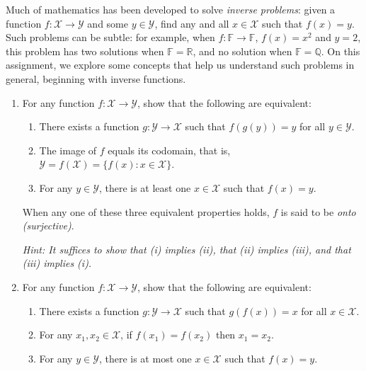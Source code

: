 \documentclass[12 pt,letterpaper]{article}
\newcommand{\bbF}{\mathbb{F}}
\newcommand{\bbQ}{\mathbb{Q}}
\newcommand{\bbR}{\mathbb{R}}
\newcommand{\calX}{\mathcal{X}}
\newcommand{\calY}{\mathcal{Y}}
\newcommand{\set}[1]{\{{#1}\}}
\newcommand{\romanii}{\renewcommand{\labelenumii}{(\roman{enumii})}}
\begin{document}
\noindent
Much of mathematics has been developed to solve \textit{inverse problems}:
given a function $f:\calX\rightarrow\calY$ and some $y\in\calY$,
find any and all $x\in\calX$ such that $f(x)=y$.
Such problems can be subtle:
for example, when $f:\bbF\rightarrow\bbF$, $f(x)=x^2$ and $y=2$,
this problem has two solutions when $\bbF=\bbR$,
and no solution when $\bbF=\bbQ$.
On this assignment,
we explore some concepts that help us understand such problems in general,
beginning with inverse functions.

\begin{enumerate}

\item
For any function $f:\calX\rightarrow\calY$,
show that the following are equivalent:

\begin{enumerate}
\romanii

\item
There exists a function $g:\calY\rightarrow\calX$ such that $f(g(y))=y$ for all $y\in\calY$.

\item
The image of $f$ equals its codomain, that is, $\calY=f(\calX)=\set{f(x): x\in\calX}$.

\item
For any $y\in\calY$, there is at least one $x\in\calX$ such that $f(x)=y$.

\end{enumerate}

When any one of these three equivalent properties holds,
$f$ is said to be \textit{onto (surjective)}.

\textit{Hint: It suffices to show that (i) implies (ii), that (ii) implies (iii), and that (iii) implies (i).}

\item
For any function $f:\calX\rightarrow\calY$,
show that the following are equivalent:

\begin{enumerate}
\romanii

\item
There exists a function $g:\calY\rightarrow\calX$ such that $g(f(x))=x$ for all $x\in\calX$.

\item
For any $x_1,x_2\in\calX$, if $f(x_1)=f(x_2)$ then $x_1=x_2$.

\item
For any $y\in\calY$, there is at most one $x\in\calX$ such that $f(x)=y$.


\end{enumerate}
\end{enumerate}
\end{document}
